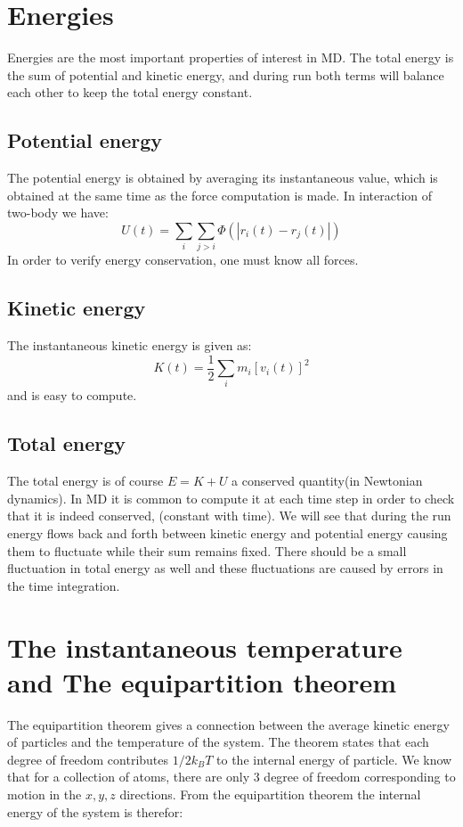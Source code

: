 \documentclass[a4paper]{article}
\begin{document}
\section{Energies}
Energies are the most important properties of interest in MD. The total energy is the sum of potential and kinetic energy, and during run both terms will balance each other to keep the total energy constant. 
\subsection{Potential energy}
The potential energy is obtained by averaging its instantaneous value, which is obtained at the same time as the force computation is made. In interaction of two-body we have: 
\begin{equation}
U(t) = \sum_{i} \sum_{j>i} \Phi \left( \left | r_i(t)-r_j(t)\right |\right)
\end{equation}
In order to verify energy conservation, one must know all forces. 
\subsection{Kinetic energy}
The instantaneous kinetic energy is given as:
\begin{equation}
K(t) = \frac{1}{2} \sum_{i} m_i [v_i(t)]^2
\end{equation}
and is easy to compute. 
\subsection{Total energy}
The total energy is of course $E = K + U $ a conserved quantity(in Newtonian dynamics). In MD it is common to compute it at each time step in order to check that it is indeed conserved, (constant with time). We will see that during the run energy flows back and forth between kinetic energy and potential energy causing them to fluctuate while their sum remains fixed. There should be a small fluctuation in total energy as well and these fluctuations are caused by errors in the time integration.  
\section{The instantaneous temperature and The equipartition theorem}
The equipartition theorem gives a connection between the average kinetic energy of particles and the temperature of the system. The theorem states that each degree of freedom contributes $1/2 k_B T$ to the internal energy of particle. We know that for a collection of atoms, there are only 3 degree of freedom corresponding to motion in the $x,y,z$ directions. From the equipartition theorem the internal energy of the system is therefor:
\end{document}
